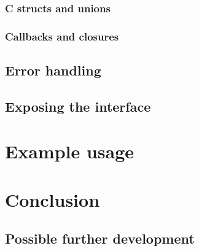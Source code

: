 \documentclass[polish, english]{iithesis}
\begin{document}
    \subsection{C structs and unions}
    \subsection{Callbacks and closures}
  \section{Error handling}
  \section{Exposing the interface}
\chapter{Example usage}
\chapter{Conclusion}
  \section{Possible further development}
\end{document}
